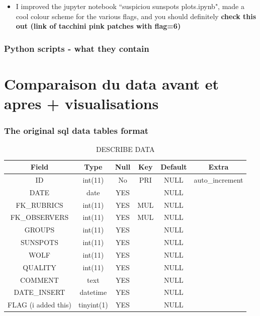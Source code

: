 \documentclass[12pt]{article}
\begin{document}
\begin{itemize}
\begin{itemize}
    \end{itemize}
    \item I improved the jupyter notebook ``suspiciou sunspots plots.ipynb", made a cool colour scheme for the various flags, and you should definitely \textbf{check this out (link of tacchini pink patches with flag=6)}
    
\end{itemize}

\subsubsection{Python scripts - what they contain}



\section{Comparaison du data avant et apres + visualisations}

\subsubsection{The original sql data tables format}

\begin{table}[h!]
    \centering
    \caption{DESCRIBE DATA}
    \begin{tabular}{c|c|c|c|c|c}%
        \textbf{Field} & \textbf{Type} & \textbf{Null} & \textbf{Key} & \textbf{Default} & \textbf{Extra}  \\
        \hline
        ID & int(11) & No & PRI & NULL & auto\_increment \\
        
        DATE & date & YES && NULL & \\
        
        FK\_RUBRICS & int(11) & YES & MUL & NULL &  \\
        
        FK\_OBSERVERS & int(11) & YES & MUL & NULL &  \\
        
        GROUPS & int(11) & YES && NULL &  \\
        
        SUNSPOTS & int(11) & YES && NULL & \\
        
        WOLF & int(11) & YES && NULL &  \\
        
        QUALITY & int(11) & YES && NULL &  \\
        
        COMMENT & text & YES && NULL &  \\
        
        DATE\_INSERT & datetime & YES && NULL &  \\
        
        FLAG (i added this) & tinyint(1) & YES && NULL &  \\
        
    \end{tabular}
    \label{tab:data-og}
\end{table}
\end{document}
